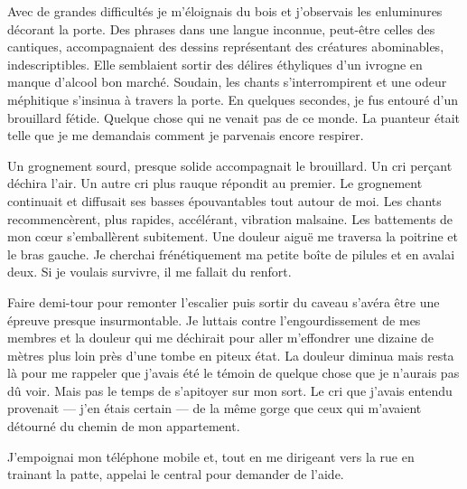 Avec de grandes difficultés je m'éloignais du bois et j'observais les enluminures décorant la porte. Des phrases dans 
une langue inconnue, peut-être celles des cantiques, accompagnaient des dessins représentant des créatures abominables, 
indescriptibles. Elle semblaient sortir des délires éthyliques d'un ivrogne en manque d'alcool bon marché. Soudain, les 
chants s'interrompirent et une odeur méphitique s'insinua à travers la porte. En quelques secondes, je fus entouré 
d'un brouillard fétide. Quelque chose qui ne venait pas de ce monde. La puanteur était telle que je me demandais 
comment je parvenais encore respirer.

Un grognement sourd, presque solide accompagnait le brouillard. Un cri perçant déchira l'air. Un autre cri plus rauque 
répondit au premier. Le grognement continuait et diffusait ses basses épouvantables tout autour de moi. Les chants 
recommencèrent, plus rapides, accélérant, vibration malsaine. Les battements de mon cœur s'emballèrent subitement. Une 
douleur aiguë me traversa la poitrine et le bras gauche. Je cherchai frénétiquement ma petite boîte de pilules et en 
avalai deux. Si je voulais survivre, il me fallait du renfort.

Faire demi-tour pour remonter l'escalier puis sortir du caveau s'avéra être une épreuve presque insurmontable. Je 
luttais contre l'engourdissement de mes membres et la douleur qui me déchirait pour aller m'effondrer une dizaine de 
mètres plus loin près d'une tombe en piteux état. La douleur diminua mais resta là pour me rappeler que j'avais été le 
témoin de quelque chose que je n'aurais pas dû voir. Mais pas le temps de s'apitoyer sur mon sort. Le cri que j'avais 
entendu provenait — j'en étais certain — de la même gorge que ceux qui m'avaient détourné du chemin de mon appartement.

J'empoignai mon téléphone mobile et, tout en me dirigeant vers la rue en trainant la patte, appelai le central pour 
demander de l'aide.
